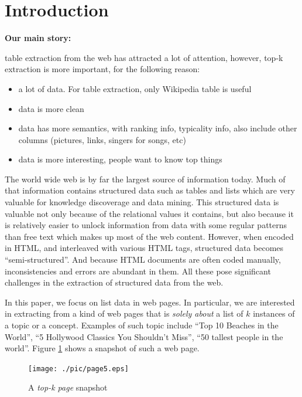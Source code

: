 \section{Introduction}
{\bf Our main story:

table extraction from the web has attracted a lot of attention, however, top-k extraction is more important, for the following reason:

\begin{itemize}
\item a lot of data. For table extraction, only Wikipedia table is useful
\item data is more clean
\item data has more semantics, with ranking info, typicality info, also include other columns (pictures, links, singers for songs, etc)
\item data is more interesting, people want to know top things
\end{itemize}
}


The world wide web is by far the largest source of information today.
Much of that information contains structured data such as tables and lists
which are very valuable for knowledge discoverage and data mining. 
This structured data is valuable not only because of the relational
values it contains, but also because it is relatively easier to unlock
information from data with some regular patterns than free text which
makes up most of the web content. However, when encoded in HTML, and 
interleaved with various HTML tags, structured data becomes 
``semi-structured''. And because HTML documents are often coded manually,
inconsistencies and errors are abundant in them. All these pose significant 
challenges in the extraction of structured data from the web.

In this paper, we focus on list data in web pages. In particular, we are 
interested in extracting from a kind of web pages that is {\em solely about}
a list of $k$ instances of a topic or a concept. Examples of such topic include 
``Top 10 Beaches in the World'', ``5 Hollywood Classics You Shouldn't Miss'', 
``50 tallest people in the world''. Figure \ref{fig:snapshotOfWebPage}
shows a snapshot of such a web page\cite{example1}.

\begin{figure}[h]
	\centering
	\texttt{[image: ./pic/page5.eps]}
	\caption{A {\em top-k page} snapshot}
	\label{fig:snapshotOfWebPage}
\end{figure}


